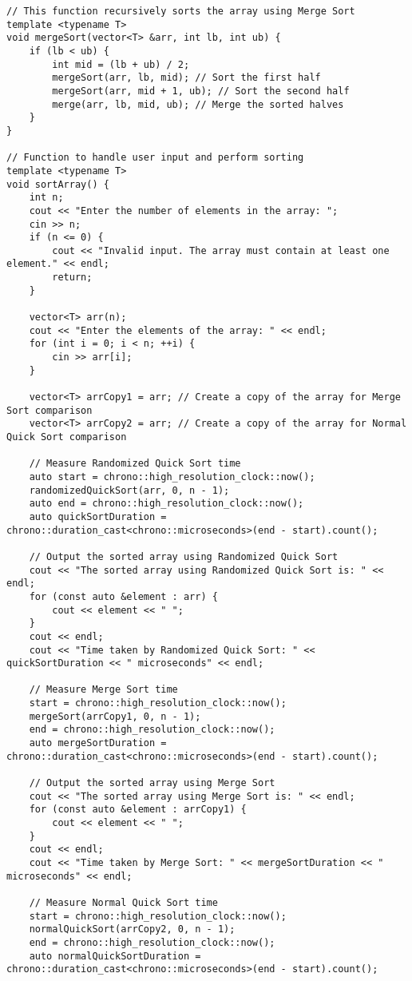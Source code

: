 \documentclass{article}
\begin{document}
\begin{lstlisting}
// This function recursively sorts the array using Merge Sort
template <typename T>
void mergeSort(vector<T> &arr, int lb, int ub) {
    if (lb < ub) {
        int mid = (lb + ub) / 2;
        mergeSort(arr, lb, mid); // Sort the first half
        mergeSort(arr, mid + 1, ub); // Sort the second half
        merge(arr, lb, mid, ub); // Merge the sorted halves
    }
}

// Function to handle user input and perform sorting
template <typename T>
void sortArray() {
    int n;
    cout << "Enter the number of elements in the array: ";
    cin >> n;
    if (n <= 0) {
        cout << "Invalid input. The array must contain at least one element." << endl;
        return;
    }

    vector<T> arr(n);
    cout << "Enter the elements of the array: " << endl;
    for (int i = 0; i < n; ++i) {
        cin >> arr[i];
    }

    vector<T> arrCopy1 = arr; // Create a copy of the array for Merge Sort comparison
    vector<T> arrCopy2 = arr; // Create a copy of the array for Normal Quick Sort comparison

    // Measure Randomized Quick Sort time
    auto start = chrono::high_resolution_clock::now();
    randomizedQuickSort(arr, 0, n - 1);
    auto end = chrono::high_resolution_clock::now();
    auto quickSortDuration = chrono::duration_cast<chrono::microseconds>(end - start).count();

    // Output the sorted array using Randomized Quick Sort
    cout << "The sorted array using Randomized Quick Sort is: " << endl;
    for (const auto &element : arr) {
        cout << element << " ";
    }
    cout << endl;
    cout << "Time taken by Randomized Quick Sort: " << quickSortDuration << " microseconds" << endl;

    // Measure Merge Sort time
    start = chrono::high_resolution_clock::now();
    mergeSort(arrCopy1, 0, n - 1);
    end = chrono::high_resolution_clock::now();
    auto mergeSortDuration = chrono::duration_cast<chrono::microseconds>(end - start).count();

    // Output the sorted array using Merge Sort
    cout << "The sorted array using Merge Sort is: " << endl;
    for (const auto &element : arrCopy1) {
        cout << element << " ";
    }
    cout << endl;
    cout << "Time taken by Merge Sort: " << mergeSortDuration << " microseconds" << endl;

    // Measure Normal Quick Sort time
    start = chrono::high_resolution_clock::now();
    normalQuickSort(arrCopy2, 0, n - 1);
    end = chrono::high_resolution_clock::now();
    auto normalQuickSortDuration = chrono::duration_cast<chrono::microseconds>(end - start).count();


\end{lstlisting}
\end{document}
